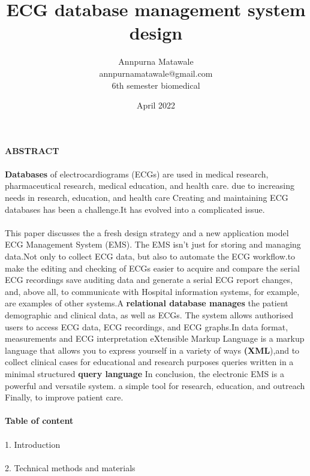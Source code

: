 \documentclass[12pt]{article}
\title{\textbf{ECG database management system design}}
\author{Annpurna Matawale\\annpurnamatawale@gmail.com\\6th semester biomedical}
\date {  April 2022}
\begin{document}
\maketitle
\textbf{ABSTRACT}
\paragraph{}
\textbf{Databases} of electrocardiograms (ECGs) are used in medical research, pharmaceutical research, medical education, and health care. due to increasing needs in research, education, and health care Creating and maintaining ECG databases has been a challenge.It has evolved into a complicated issue.\paragraph{} This paper discusses the a fresh design strategy and a new application model
ECG Management System  (EMS). The  EMS isn't just for storing and managing data.Not only to collect ECG data, but also to automate the ECG workflow.to make the editing and checking of ECGs easier to acquire and compare the serial ECG recordings
save auditing data and generate a serial ECG report changes, and, above all, to communicate with Hospital information systems, for example, are examples of other systems.A \textbf{relational database manages }the patient demographic and clinical data, as well as ECGs. The system allows authorised users to access ECG data, ECG recordings, and ECG graphs.In data format, measurements and ECG interpretation eXtensible Markup Language is a markup language that allows you to express yourself in a variety of ways \textbf{(XML}),and to collect clinical cases for educational and research purposes queries written in a minimal structured \textbf{query language} In conclusion, the electronic  EMS is a powerful and versatile system.
a simple tool for research, education, and outreach
Finally, to improve patient care.

\paragraph{\textbf{Table of content}}
\paragraph{}1. Introduction \paragraph{} 2. Technical methods and materials
\end{document}
